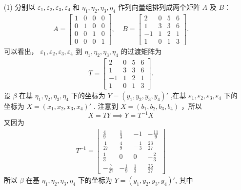 \documentclass[11pt,a4paper,openany,oneside]{book}
\begin{document}
\begin{enumerate}
\item[(1)]  
 分别以 $ \varepsilon_1, \varepsilon_2, \varepsilon_3, \varepsilon_4 $ 和 $ \eta_1, \eta_2, \eta_3, \eta_4 $ 作列向量组排列成两个矩阵 $A$ 及 $B$：
\begin{gather*}
A = 
\begin{bmatrix}
1  &  0  &  0  &  0  \\
0  &  1  &  0  &  0  \\
0  &  0  &  1  &  0  \\
0  &  0  &  0  &  1  
\end{bmatrix},
\ \ \ \ \ 
B=
\begin{bmatrix}
2  &  0  &  5  &  6  \\
1  &  3  &  3  &  6  \\
-1 &  1  &  2  &  1  \\
1  &  0  &  1  &  3  
\end{bmatrix}.
\end{gather*}
可以看出， $ \varepsilon_1, \varepsilon_2, \varepsilon_3, \varepsilon_4 $ 到 $ \eta_1, \eta_2, \eta_3, \eta_4 $ 的过渡矩阵为
\begin{gather*}
T = 
\begin{bmatrix}
2  &  0  &  5  &  6  \\
1  &  3  &  3  &  6  \\
-1 &  1  &  2  &  1  \\
1  &  0  &  1  &  3  
\end{bmatrix}.
\end{gather*}
设 $ \beta $ 在基 $ \eta_1, \eta_2, \eta_3, \eta_4 $ 下的坐标为 $ Y=(y_1, y_2, y_3, y_4)' $ ,在基 $ \varepsilon_1, \varepsilon_2, \varepsilon_3, \varepsilon_4 $ 下的坐标为 $ X=(x_1, x_2, x_3, x_4)' $ . 注意到 $ X=(b_1, b_2, b_3, b_4) $ ，所以
 $$ X = TY \implies Y = T^{-1}X $$ 
又因为
\begin{gather*}
T^{-1} = 
\left[\begin{array}{rrrr}
\frac{4}{9}  &  \frac{1}{3}  &  -1  &  -\frac{11}{9} \\
\frac{1}{27} &  \frac{4}{9}  &  -\frac{1}{3} & \frac{23}{27} \\
\frac{1}{3}  &  0             &     0          &  -\frac{2}{3}  \\
-\frac{7}{27} & -\frac{1}{9} &  \frac{1}{3}  &  \frac{26}{27}
\end{array} \right]
\end{gather*}
所以 $ \beta $ 在基 $ \eta_1, \eta_2, \eta_3, \eta_4 $ 下的坐标为 $ Y=(y_1, y_2, y_3, y_4)' $, 其中


\end{enumerate}
\end{document}
